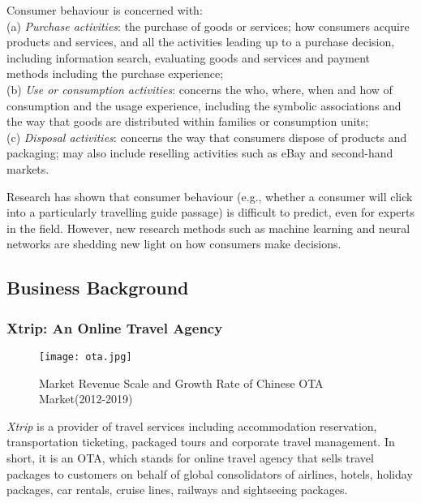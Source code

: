 \documentclass{article}
\begin{document}
	Consumer behaviour is concerned with: \\

	(a) \emph{Purchase activities}: the purchase of goods or services; how consumers acquire products and services, and all the activities leading up to a purchase decision, including information search, evaluating goods and services and payment methods including the purchase experience;\\

    (b) \emph{Use or consumption activities}: concerns the who, where, when and how of consumption and the usage experience, including the symbolic associations and the way that goods are distributed within families or consumption units;\\

    (c) \emph{Disposal activities}: concerns the way that consumers dispose of products and packaging; may also include reselling activities such as eBay and second-hand markets.~\cite{deaton80:economics, schofer01:word, sheth85:history}

	Research has shown that consumer behaviour (e.g., whether a consumer will click into a particularly travelling guide passage) is difficult to predict, even for experts in the field. However, new research methods such as machine learning and neural networks are shedding new light on how consumers make decisions.

    \subsection{Business Background}
    \label{sec:bb}

    \subsubsection{Xtrip: An Online Travel Agency}
    \label{sec:ota}
    
    \begin{figure}[!h]
		\centering
		\texttt{[image: ota.jpg]}
		\caption{\small{Market Revenue Scale and Growth Rate of Chinese OTA Market(2012-2019)~\cite{ota}}}
		\label{fig:ota}
	\end{figure}

	\emph{Xtrip} is a provider of travel services including accommodation reservation, transportation ticketing, packaged tours and corporate travel management. In short, it is an OTA, which stands for online travel agency that sells travel packages to customers on behalf of global consolidators of airlines, hotels, holiday packages, car rentals, cruise lines, railways and sightseeing packages. 
\end{document}
